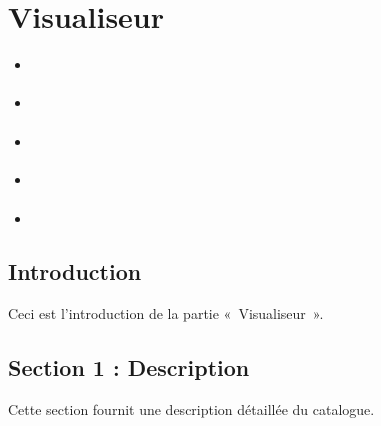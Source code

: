 \documentclass[letterpaper,10pt,french]{sphinxmanual}
\begin{document}
\sphinxstepscope


\section{Visualiseur}
\label{\detokenize{doc_user/visualiseur:visualiseur}}\label{\detokenize{doc_user/visualiseur::doc}}\label{\detokenize{doc_user/visualiseur:id1}}
\begin{sphinxShadowBox}
\begin{itemize}
\item {} 
\sphinxAtStartPar
{}\label{\detokenize{doc_user/visualiseur:id2}}{\hyperref[\detokenize{doc_user/visualiseur:introduction}]{}}

\item {} 
\sphinxAtStartPar
{}\label{\detokenize{doc_user/visualiseur:id3}}{\hyperref[\detokenize{doc_user/visualiseur:section-1-description}]{}}

\item {} 
\sphinxAtStartPar
{}\label{\detokenize{doc_user/visualiseur:id4}}{\hyperref[\detokenize{doc_user/visualiseur:section-2-fonctionnalites}]{}}

\item {} 
\sphinxAtStartPar
{}\label{\detokenize{doc_user/visualiseur:id5}}{\hyperref[\detokenize{doc_user/visualiseur:section-3-utilisation}]{}}

\item {} 
\sphinxAtStartPar
{}\label{\detokenize{doc_user/visualiseur:id6}}{\hyperref[\detokenize{doc_user/visualiseur:section-4-conseils-et-astuces}]{}}

\end{itemize}
\end{sphinxShadowBox}


\subsection{Introduction}
\label{\detokenize{doc_user/visualiseur:introduction}}
\sphinxAtStartPar
Ceci est l’introduction de la partie « Visualiseur ».


\subsection{Section 1 : Description}
\label{\detokenize{doc_user/visualiseur:section-1-description}}
\sphinxAtStartPar
Cette section fournit une description détaillée du catalogue.
\end{document}
